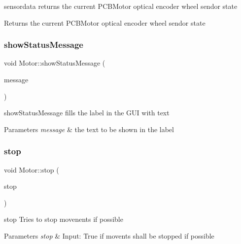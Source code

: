 sensordata returns the current P\+C\+B\+Motor optical encoder wheel sendor state 

\begin{DoxyReturn}{Returns}
the current P\+C\+B\+Motor optical encoder wheel sendor state 
\end{DoxyReturn}
\mbox{\label{classMotor_a3d9df9be923b64306fa28dff13ceaa2e}} 
\subsubsection{\texorpdfstring{show\+Status\+Message}{showStatusMessage}}
{\footnotesize\ttfamily void Motor\+::show\+Status\+Message (\begin{DoxyParamCaption}\item[{const Q\+String \&}]{message }\end{DoxyParamCaption})\hspace{0.3cm}{\ttfamily [slot]}}



show\+Status\+Message fills the label in the G\+UI with text 


\begin{DoxyParams}{Parameters}
{\em message} & the text to be shown in the label \\
\hline
\end{DoxyParams}
\mbox{\label{classMotor_a9ca6508221ea2c42a5220848ab37df30}} 
\subsubsection{\texorpdfstring{stop}{stop}}
{\footnotesize\ttfamily void Motor\+::stop (\begin{DoxyParamCaption}\item[{bool}]{stop }\end{DoxyParamCaption})\hspace{0.3cm}{\ttfamily [slot]}}



stop Tries to stop movenents if possible 


\begin{DoxyParams}{Parameters}
{\em stop} & Input\+: True if movents shall be stopped if possible \\
\hline
\end{DoxyParams}
\mbox{\label{classMotor_a8305ead4b01433cb8a01eb5440a8b570}} 
